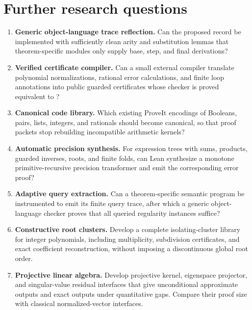 \section{Further research questions}
\label{sec:research}

\begin{enumerate}
\item \textbf{Generic object-language trace reflection.}
Can the proposed  record be implemented with sufficiently
clean arity and substitution lemmas that theorem-specific modules only supply
base, step, and final derivations?

\item \textbf{Verified certificate compiler.}
Can a small external compiler translate polynomial normalizations, rational
error calculations, and finite loop annotations into public guarded
certificates whose checker is proved equivalent to ?

\item \textbf{Canonical code library.}
Which existing ProveIt encodings of Booleans, pairs, lists, integers, and
rationals should become canonical, so that proof packets stop rebuilding
incompatible arithmetic kernels?

\item \textbf{Automatic precision synthesis.}
For expression trees with sums, products, guarded inverses, roots, and finite
folds, can Lean synthesize a monotone primitive-recursive precision transformer
and emit the corresponding error proof?

\item \textbf{Adaptive query extraction.}
Can a theorem-specific semantic program be instrumented to emit its finite
query trace, after which a generic object-language checker proves that all
queried regularity instances suffice?

\item \textbf{Constructive root clusters.}
Develop a complete isolating-cluster library for integer polynomials, including
multiplicity, subdivision certificates, and exact coefficient reconstruction,
without imposing a discontinuous global root order.

\item \textbf{Projective linear algebra.}
Develop projective kernel, eigenspace projector, and singular-value residual
interfaces that give unconditional approximate outputs and exact outputs under
quantitative gaps.  Compare their proof size with classical normalized-vector
interfaces.


\end{enumerate}
